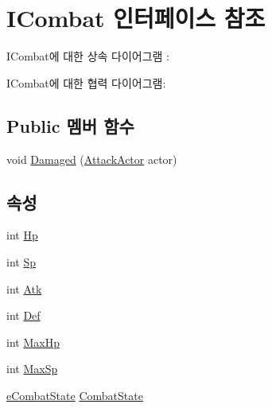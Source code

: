 \hypertarget{interface_i_combat}{}\section{I\+Combat 인터페이스 참조}
\label{interface_i_combat}


I\+Combat에 대한 상속 다이어그램 \+: 


I\+Combat에 대한 협력 다이어그램\+:
\subsection*{Public 멤버 함수}
\begin{DoxyCompactItemize}
\item 
void \hyperlink{interface_i_combat_ab8df637ef6ddd1c4a0689cafba32f3b9}{Damaged} (\hyperlink{class_attack_actor}{Attack\+Actor} actor)
\end{DoxyCompactItemize}
\subsection*{속성}
\begin{DoxyCompactItemize}
\item 
int \hyperlink{interface_i_combat_aa9d63fa3662b41ec000a73b9bfa663c4}{Hp}
\item 
int \hyperlink{interface_i_combat_a833ef74923f764476c432b48be18ac90}{Sp}
\item 
int \hyperlink{interface_i_combat_a63d4002359409bac694aecdff0120c43}{Atk}
\item 
int \hyperlink{interface_i_combat_a7d659a107f8e0f610cd74f1da0218e43}{Def}
\item 
int \hyperlink{interface_i_combat_a5c6ed297759d86d674077ee495226cc3}{Max\+Hp}
\item 
int \hyperlink{interface_i_combat_ab40a631d18b8bff65e84be84f0061708}{Max\+Sp}
\item 
\hyperlink{_combat_object_8cs_ae6d9f4a8ae9fffcdf1a546168a44f917}{e\+Combat\+State} \hyperlink{interface_i_combat_aef944c90874b03051f60395f3c8532e4}{Combat\+State}
\end{DoxyCompactItemize}


